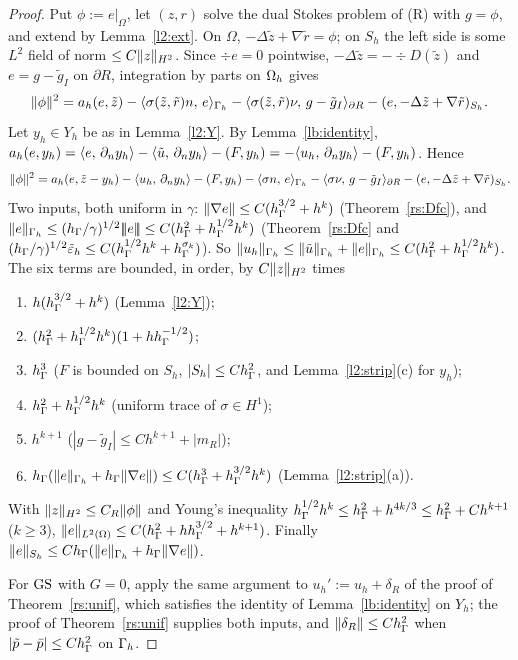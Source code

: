 \begin{proof}
Put $\phi:=e|_\Omega$, let $(z,r)$ solve the dual Stokes problem of (R) with $g=\phi$, and extend by Lemma~\ref{l2:ext}. On $\Omega$, $-\Delta\tilde z+\nabla\tilde r=\phi$; on $S_h$ the left side is some $L^2$ field of norm $\le C\lVert z\rVert_{H^2}$. Since $\div e=0$ pointwise, $-\Delta\tilde z=-\div D(\tilde z)$ and $e=g-\tilde g_I$ on $\partial R$, integration by parts on $\Omega_h$ gives
\[
\lVert \phi\rVert^2=a_h(e,\tilde z)-\langle \sigma(\tilde z,\tilde r)n,\, e\rangle_{\Gamma_h}-\langle \sigma(\tilde z,\tilde r)\nu,\, g-\tilde g_I\rangle_{\partial R}-(e,-\Delta\tilde z+\nabla\tilde r)_{S_h}.
\]
Let $y_h\in Y_h$ be as in Lemma~\ref{l2:Y}. By Lemma~\ref{lb:identity}, $a_h(e,y_h)=\langle e,\, \partial_n y_h\rangle-\langle \tilde u,\, \partial_n y_h\rangle-(F,y_h)=-\langle u_h,\, \partial_n y_h\rangle-(F,y_h)$. Hence
\[
\lVert \phi\rVert^2=a_h(e,\tilde z-y_h)-\langle u_h,\, \partial_n y_h\rangle-(F,y_h)-\langle \sigma n,\, e\rangle_{\Gamma_h}-\langle \sigma\nu,\, g-\tilde g_I\rangle_{\partial R}-(e,-\Delta\tilde z+\nabla\tilde r)_{S_h}.
\]
Two inputs, both uniform in $\gamma$: $\lVert \nabla e\rVert\le C(h_\Gamma^{3/2}+h^k)$ (Theorem~\ref{rs:Dfc}), and $\lVert e\rVert_{\Gamma_h}\le(h_\Gamma/\gamma)^{1/2}|\!|\!|e|\!|\!|\le C(h_\Gamma^2+h_\Gamma^{1/2}h^k)$ (Theorem~\ref{rs:Dfc} and $(h_\Gamma/\gamma)^{1/2}\tilde\varepsilon_h\le C(h_\Gamma^{1/2}h^k+h_\Gamma^{\sigma_k})$). So $\lVert u_h\rVert_{\Gamma_h}\le\lVert \tilde u\rVert_{\Gamma_h}+\lVert e\rVert_{\Gamma_h}\le C(h_\Gamma^2+h_\Gamma^{1/2}h^k)$. The six terms are bounded, in order, by $C\lVert z\rVert_{H^2}$ times
\begin{enumerate}
\item $h(h_\Gamma^{3/2}+h^k)$ (Lemma~\ref{l2:Y});
\item $(h_\Gamma^2+h_\Gamma^{1/2}h^k)(1+hh_\Gamma^{-1/2})$;
\item $h_\Gamma^3$ ($F$ is bounded on $S_h$, $|S_h|\le Ch_\Gamma^2$, and Lemma~\ref{l2:strip}(c) for $y_h$);
\item $h_\Gamma^2+h_\Gamma^{1/2}h^k$ (uniform trace of $\sigma\in H^1$);
\item $h^{k+1}$ ($|g-\tilde g_I|\le Ch^{k+1}+|m_R|$);
\item $h_\Gamma(\lVert e\rVert_{\Gamma_h}+h_\Gamma\lVert \nabla e\rVert)\le C(h_\Gamma^3+h_\Gamma^{3/2}h^k)$ (Lemma~\ref{l2:strip}(a)).
\end{enumerate}
With $\lVert z\rVert_{H^2}\le C_R\lVert \phi\rVert$ and Young's inequality $h_\Gamma^{1/2}h^k\le h_\Gamma^2+h^{4k/3}\le h_\Gamma^2+Ch^{k+1}$ ($k\ge3$), $\lVert e\rVert_{L^2(\Omega)}\le C(h_\Gamma^2+hh_\Gamma^{3/2}+h^{k+1})$. Finally $\lVert e\rVert_{S_h}\le Ch_\Gamma(\lVert e\rVert_{\Gamma_h}+h_\Gamma\lVert \nabla e\rVert)$.

For $\mathrm{GS}$ with $G=0$, apply the same argument to $u_h':=u_h+\delta_R$ of the proof of Theorem~\ref{rs:unif}, which satisfies the identity of Lemma~\ref{lb:identity} on $Y_h$; the proof of Theorem~\ref{rs:unif} supplies both inputs, and $\lVert \delta_R\rVert\le Ch_\Gamma^2$ when $|\tilde p-\bar p|\le Ch_\Gamma^2$ on $\Gamma_h$.
\end{proof}


